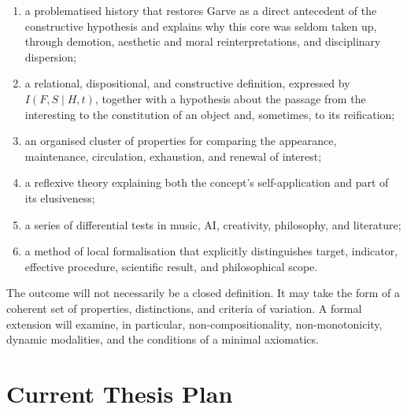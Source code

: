 \documentclass[11pt,a4paper]{article}
\begin{document}
\begin{enumerate}
  \item a problematised history that restores Garve as a direct antecedent of
        the constructive hypothesis and explains why this core was seldom taken
        up, through demotion, aesthetic and moral reinterpretations, and disciplinary
        dispersion;
  \item a relational, dispositional, and constructive definition, expressed by
        \(I(F,S\mid H,t)\), together with a hypothesis about the passage from
        the interesting to the constitution of an object and, sometimes, to
        its reification;
  \item an organised cluster of properties for comparing the appearance,
        maintenance, circulation, exhaustion, and renewal of interest;
  \item a reflexive theory explaining both the concept's self-application and
        part of its elusiveness;
  \item a series of differential tests in music, AI, creativity, philosophy,
        and literature;
  \item a method of local formalisation that explicitly distinguishes target,
        indicator, effective procedure, scientific result, and philosophical
        scope.
\end{enumerate}

The outcome will not necessarily be a closed definition. It may take the form
of a coherent set of properties, distinctions, and criteria of
variation. A formal extension will examine, in particular,
non-compositionality, non-monotonicity, dynamic modalities, and the conditions
of a minimal axiomatics.

\section{Current Thesis Plan}
\end{document}
